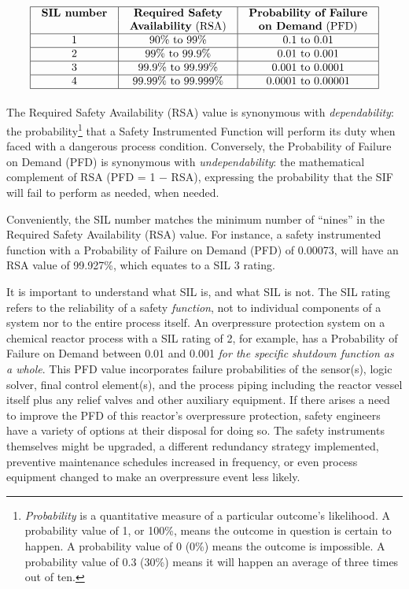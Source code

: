 $$\vbox{\offinterlineskip
\halign{\strut
\vrule \quad\hfil # \ \hfil & 
\vrule \quad\hfil # \ \hfil & 
\vrule \quad\hfil # \ \hfil \vrule \cr
\noalign{\hrule}
%
\textbf{SIL number} & \textbf{Required Safety} & \textbf{Probability of Failure} \cr
 & \textbf{Availability} (RSA) & \textbf{on Demand} (PFD) \cr
%
\noalign{\hrule}
%
1 & 90\% to 99\% & 0.1 to 0.01 \cr
%
\noalign{\hrule}
%
2 & 99\% to 99.9\% & 0.01 to 0.001 \cr
%
\noalign{\hrule}
%
3 & 99.9\% to 99.99\% & 0.001 to 0.0001 \cr
%
\noalign{\hrule}
%
4 & 99.99\% to 99.999\% & 0.0001 to 0.00001 \cr
%
\noalign{\hrule}
} %
}$$ %

The Required Safety Availability (RSA) value is synonymous with \textit{dependability}: the probability\footnote{\textit{Probability} is a quantitative measure of a particular outcome's likelihood.  A probability value of 1, or 100\%, means the outcome in question is certain to happen.  A probability value of 0 (0\%) means the outcome is impossible.  A probability value of 0.3 (30\%) means it will happen an average of three times out of ten.} that a Safety Instrumented Function will perform its duty when faced with a dangerous process condition.  Conversely, the Probability of Failure on Demand (PFD) is synonymous with \textit{undependability}: the mathematical complement of RSA (PFD = 1 $-$ RSA), expressing the probability that the SIF will fail to perform as needed, when needed.            

Conveniently, the SIL number matches the minimum number of ``nines'' in the Required Safety Availability (RSA) value.  For instance, a safety instrumented function with a Probability of Failure on Demand (PFD) of 0.00073, will have an RSA value of 99.927\%, which equates to a SIL 3 rating.

\vskip 10pt

It is important to understand what SIL is, and what SIL is not.  The SIL rating refers to the reliability of a safety \textit{function}, not to individual components of a system nor to the entire process itself.  An overpressure protection system on a chemical reactor process with a SIL rating of 2, for example, has a Probability of Failure on Demand between 0.01 and 0.001 \textit{for the specific shutdown function as a whole}.  This PFD value incorporates failure probabilities of the sensor(s), logic solver, final control element(s), and the process piping including the reactor vessel itself plus any relief valves and other auxiliary equipment.  If there arises a need to improve the PFD of this reactor's overpressure protection, safety engineers have a variety of options at their disposal for doing so.  The safety instruments themselves might be upgraded, a different redundancy strategy implemented, preventive maintenance schedules increased in frequency, or even process equipment changed to make an overpressure event less likely.


